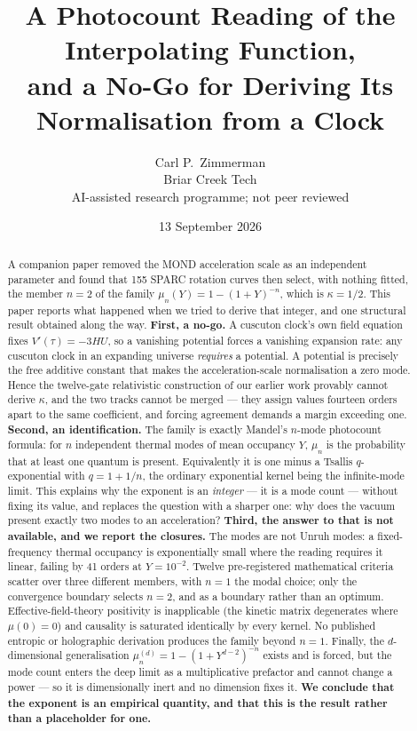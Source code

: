 \documentclass[11pt,letterpaper]{article}
\title{A Photocount Reading of the Interpolating Function,\\ and a No-Go for Deriving Its Normalisation from a Clock}
\author{Carl P.\ Zimmerman\\ \small Briar Creek Tech\\ \small AI-assisted research programme; not peer reviewed}
\date{13 September 2026}
\begin{document}
\maketitle
\begin{abstract}
A companion paper removed the MOND acceleration scale as an independent parameter and found that 155 SPARC rotation curves then select, with nothing fitted, the member $n=2$ of the family $\mu_n(Y)=1-(1+Y)^{-n}$, which is $\kappa=1/2$. This paper reports what happened when we tried to derive that integer, and one structural result obtained along the way. \textbf{First, a no-go.} A cuscuton clock's own field equation fixes $V'(\tau)=-3HU$, so a vanishing potential forces a vanishing expansion rate: any cuscuton clock in an expanding universe \emph{requires} a potential. A potential is precisely the free additive constant that makes the acceleration-scale normalisation a zero mode. Hence the twelve-gate relativistic construction of our earlier work provably cannot derive $\kappa$, and the two tracks cannot be merged --- they assign values fourteen orders apart to the same coefficient, and forcing agreement demands a margin exceeding one. \textbf{Second, an identification.} The family is exactly Mandel's $n$-mode photocount formula: for $n$ independent thermal modes of mean occupancy $Y$, $\mu_n$ is the probability that at least one quantum is present. Equivalently it is one minus a Tsallis $q$-exponential with $q=1+1/n$, the ordinary exponential kernel being the infinite-mode limit. This explains why the exponent is an \emph{integer} --- it is a mode count --- without fixing its value, and replaces the question with a sharper one: why does the vacuum present exactly two modes to an acceleration? \textbf{Third, the answer to that is not available, and we report the closures.} The modes are not Unruh modes: a fixed-frequency thermal occupancy is exponentially small where the reading requires it linear, failing by 41 orders at $Y=10^{-2}$. Twelve pre-registered mathematical criteria scatter over three different members, with $n=1$ the modal choice; only the convergence boundary selects $n=2$, and as a boundary rather than an optimum. Effective-field-theory positivity is inapplicable (the kinetic matrix degenerates where $\mu(0)=0$) and causality is saturated identically by every kernel. No published entropic or holographic derivation produces the family beyond $n=1$. Finally, the $d$-dimensional generalisation $\mu_n^{(d)}=1-(1+Y^{d-2})^{-n}$ exists and is forced, but the mode count enters the deep limit as a multiplicative prefactor and cannot change a power --- so it is dimensionally inert and no dimension fixes it. \textbf{We conclude that the exponent is an empirical quantity, and that this is the result rather than a placeholder for one.}
\end{abstract}
\end{document}
